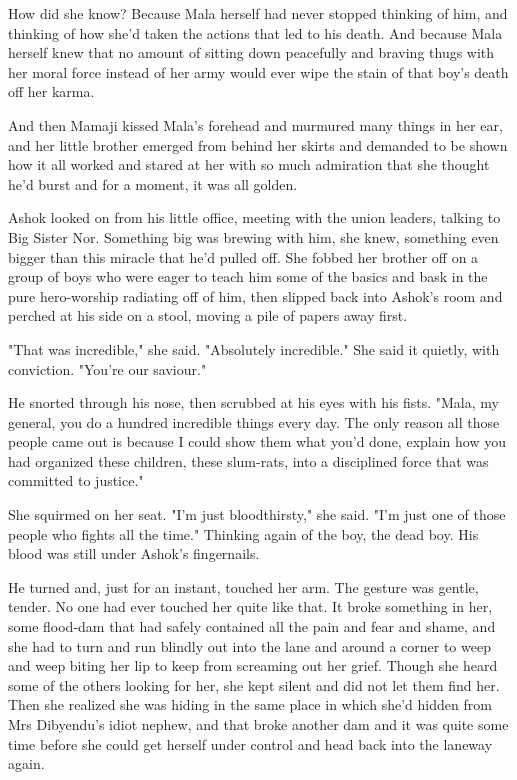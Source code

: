 How did she know? Because Mala herself had never stopped thinking
of him, and thinking of how she'd taken the actions that led to his
death. And because Mala herself knew that no amount of sitting down
peacefully and braving thugs with her moral force instead of her
army would ever wipe the stain of that boy's death off her karma.

And then Mamaji kissed Mala's forehead and murmured many things in
her ear, and her little brother emerged from behind her skirts and
demanded to be shown how it all worked and stared at her with so
much admiration that she thought he'd burst and for a moment, it
was all golden.

Ashok looked on from his little office, meeting with the union
leaders, talking to Big Sister Nor. Something big was brewing with
him, she knew, something even bigger than this miracle that he'd
pulled off. She fobbed her brother off on a group of boys who were
eager to teach him some of the basics and bask in the pure
hero-worship radiating off of him, then slipped back into Ashok's
room and perched at his side on a stool, moving a pile of papers
away first.

"That was incredible," she said. "Absolutely incredible." She said
it quietly, with conviction. "You're our saviour."

He snorted through his nose, then scrubbed at his eyes with his
fists. "Mala, my general, you do a hundred incredible things every
day. The only reason all those people came out is because I could
show them what you'd done, explain how you had organized these
children, these slum-rats, into a disciplined force that was
committed to justice."

She squirmed on her seat. "I'm just bloodthirsty," she said. "I'm
just one of those people who fights all the time." Thinking again
of the boy, the dead boy. His blood was still under Ashok's
fingernails.

He turned and, just for an instant, touched her arm. The gesture
was gentle, tender. No one had ever touched her quite like that. It
broke something in her, some flood-dam that had safely contained
all the pain and fear and shame, and she had to turn and run
blindly out into the lane and around a corner to weep and weep
biting her lip to keep from screaming out her grief. Though she
heard some of the others looking for her, she kept silent and did
not let them find her. Then she realized she was hiding in the same
place in which she'd hidden from Mrs Dibyendu's idiot nephew, and
that broke another dam and it was quite some time before she could
get herself under control and head back into the laneway again.

